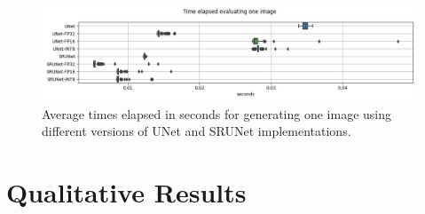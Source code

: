 \begin{figure}[ht]
\includegraphics[width=1.0\textwidth]{static/boxplots_timings.jpg}
\caption{Average times elapsed in seconds for generating one image using different versions of UNet and SRUNet implementations.}
\label{fig:timings}
\end{figure}

% 

\clearpage

\section{Qualitative Results}
\label{sec:qualitative-results}

